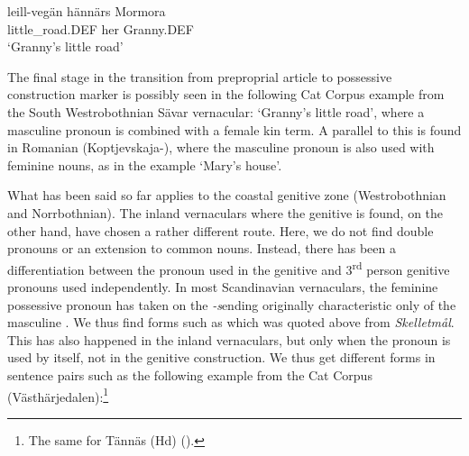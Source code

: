 
\ea\label{}
\gll leill-vegän  hännärs  Mormora\\
little\_road.DEF  her  Granny.DEF\\
\glt ‘Granny’s little road’
\z

 The final stage in the transition from preproprial article to possessive construction marker is possibly seen in the following Cat Corpus example from the South Westrobothnian Sävar vernacular: ‘Granny’s little road’, where a masculine pronoun is combined with a female kin term. A parallel to this is found in Romanian (Koptjevskaja-\citet[632]{Tamm2003}), where the masculine pronoun  is also used with feminine nouns, as in the example  ‘Mary’s house’.


What has been said so far applies to the coastal genitive zone (Westrobothnian and Norrbothnian). The inland vernaculars where the genitive is found, on the other hand, have chosen a rather different route. Here, we do not find double pronouns or an extension to common nouns. Instead, there has been a differentiation between the pronoun used in the genitive and 3\textsuperscript{rd} person genitive pronouns used independently. In most Scandinavian vernaculars, the feminine possessive pronoun has taken on the\textit{ {}-s}\textstyleLinguisticExample{ }ending originally characteristic only of the masculine . We thus find forms such as  which was quoted above from \textit{Skelletmål}. This has also happened in the inland vernaculars, but only when the pronoun is used by itself, not in the genitive construction. We thus get different forms in sentence pairs such as the following example from the Cat Corpus (Västhärjedalen):\footnote{ The same for Tännäs (Hd) (\citet[22]{Olofsson1999}).}


\ea\label{}

